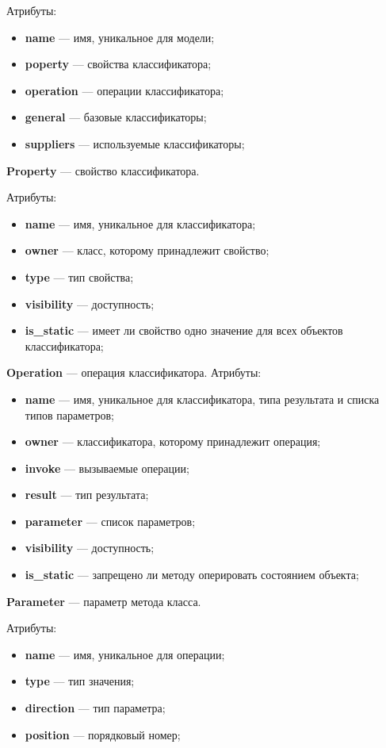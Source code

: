 Атрибуты:
\begin{itemize}
\item \textbf{name} --- имя, уникальное для модели;
\item \textbf{poperty} --- свойства классификатора;
\item \textbf{operation} --- операции классификатора;
\item \textbf{general} --- базовые классификаторы;
\item \textbf{suppliers} --- используемые классификаторы;
\end{itemize}

\textbf{Property} --- свойство классификатора.

Атрибуты:
\begin{itemize}
\item \textbf{name} --- имя, уникальное для классификатора;
\item \textbf{owner} --- класс, которому принадлежит свойство;
\item \textbf{type} --- тип свойства;
\item \textbf{visibility} --- доступность;
\item \textbf{is\_static} --- имеет ли свойство одно значение для всех объектов классификатора;
\end{itemize}

\textbf{Operation} --- операция классификатора.
Атрибуты:
\begin{itemize}
\item \textbf{name} --- имя, уникальное для классификатора, типа результата и списка типов параметров;
\item \textbf{owner} --- классификатора, которому принадлежит операция;
\item \textbf{invoke} --- вызываемые операции;
\item \textbf{result} --- тип результата;
\item \textbf{parameter} --- список параметров;
\item \textbf{visibility} --- доступность;
\item \textbf{is\_static} --- запрещено ли методу оперировать состоянием объекта;
\end{itemize}

\textbf{Parameter} --- параметр метода класса.

Атрибуты:
\begin{itemize}
\item \textbf{name} --- имя, уникальное для операции;
\item \textbf{type} --- тип значения;
\item \textbf{direction} --- тип параметра;
\item \textbf{position} --- порядковый номер;
\end{itemize}

